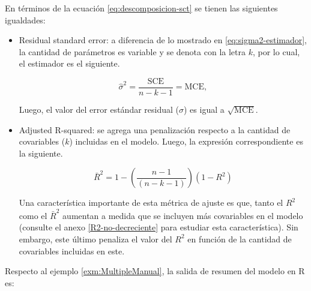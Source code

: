 \documentclass[
  11pt,
]{book}
\newenvironment{Shaded}{\begin{snugshade}}{\end{snugshade}}
\newcommand{\CommentTok}[1]{\textcolor[rgb]{0.56,0.35,0.01}{\textit{#1}}}
\newcommand{\FunctionTok}[1]{\textcolor[rgb]{0.13,0.29,0.53}{\textbf{#1}}}
\newcommand{\NormalTok}[1]{#1}
\newcommand{\OtherTok}[1]{\textcolor[rgb]{0.56,0.35,0.01}{#1}}
\newcommand{\SpecialCharTok}[1]{\textcolor[rgb]{0.81,0.36,0.00}{\textbf{#1}}}
\newcommand{\StringTok}[1]{\textcolor[rgb]{0.31,0.60,0.02}{#1}}
\theoremstyle{definition}
\theoremstyle{definition}
\theoremstyle{definition}
\theoremstyle{definition}
\theoremstyle{remark}
\begin{document}
En términos de la ecuación \eqref{eq:descomposicion-sct} se tienen las siguientes igualdades:

\begin{itemize}
\item
  Residual standard error: a diferencia de lo mostrado en \eqref{eq:sigma2-estimador}, la cantidad de parámetros es variable y se denota con la letra \(k\), por lo cual, el estimador es el siguiente.

  \begin{equation}
  \widehat{\sigma}^2 = \frac{\text{SCE}}{n-k-1} = \text{MCE},
  \label{eq:error-estandar-residual-RLM}
  \end{equation}

  Luego, el valor del error estándar residual (\(\widehat{\sigma}\)) es igual a \(\sqrt{\text{MCE}}\).
\item
  Adjusted R-squared: se agrega una penalización respecto a la cantidad de covariables (\(k\)) incluidas en el modelo. Luego, la expresión correspondiente es la siguiente.

  \begin{equation}
  \bar{R}^2 = 1-\left(\frac{n-1}{(n-k-1)}\right)(1-R^2)
  \label{eq:r2-ajustado}
  \end{equation}

  Una característica importante de esta métrica de ajuste es que, tanto el \(R^2\) como el \(\bar{R}^2\) aumentan a medida que se incluyen más covariables en el modelo (consulte el anexo \ref{R2-no-decreciente} para estudiar esta característica). Sin embargo, este último penaliza el valor del \(R^2\) en función de la cantidad de covariables incluidas en este.
\end{itemize}

Respecto al ejemplo \ref{exm:MultipleManual}, la salida de resumen del modelo en R es:

\begin{Shaded}
\end{Shaded}
\end{document}
